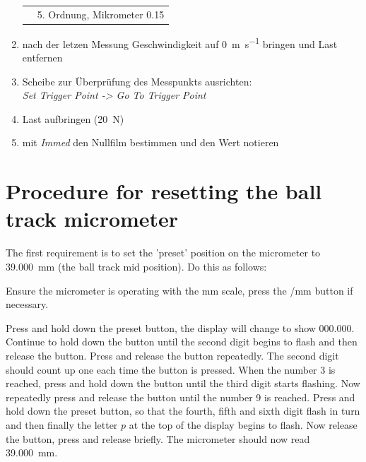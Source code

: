 \begin{appendices}
\begin{enumerate}
\begin{tabular}{ll}
                                                        & 5. Ordnung, Mikrometer \num{0.15} \\
                \end{tabular}
            \item nach der letzen Messung Geschwindigkeit auf \SI[per-mode=symbol]{0}{\meter\per\second} bringen und Last entfernen
            \item Scheibe zur Überprüfung des Messpunkts ausrichten: \\
                \textit{Set Trigger Point -> Go To Trigger Point}
            \item Last aufbringen (\SI{20}{\newton})
            \item mit \textit{Immed} den Nullfilm bestimmen und den Wert notieren
        \end{enumerate}

    \section{Procedure for resetting the ball track micrometer}
    The first requirement is to set the 'preset' position on the micrometer to \SI{39.000}{\milli\meter} (the ball track mid position). Do this as follows:

    Ensure the micrometer is operating with the \si{\mm} scale, press the \si[per-mode=symbol]{\inch\per\mm} button if necessary.

    Press and hold down the preset button, the display will change to show \num{000.000}.
    Continue to hold down the button until the second digit begins to flash and then release the button.
    Press and release the button repeatedly.
    The second digit should count up one each time the button is pressed.
    When the number \num{3} is reached, press and hold down the button until the third digit starts flashing.
    Now repeatedly press and release the button until the number 9 is reached.
    Press and hold down the preset button, so that the fourth, fifth and sixth digit flash in turn and then finally the letter $p$ at the top of the display begins to flash.
    Now release the button, press and release briefly.
    The micrometer should now read \SI{39.000}{\mm}.


\end{appendices}
